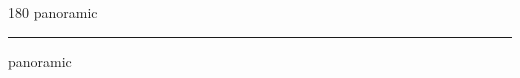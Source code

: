 
\begin{frame}
\begin{center}
\begin{turn}{180}
{\fontsize{2.5cm}{1em}\selectfont panoramic}
\end{turn}
\vspace{1em}\par  
\hrule
\vspace{1em}\par  
{\fontsize{2.5cm}{1em}\selectfont panoramic}
\end{center}
\end{frame}

